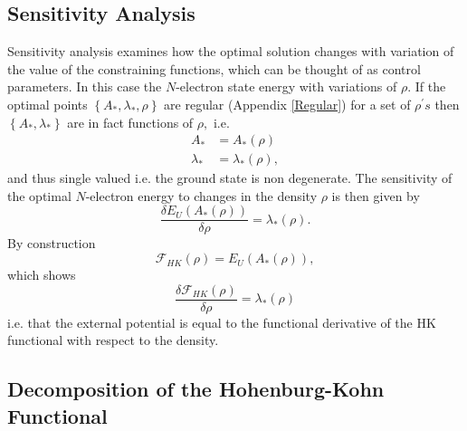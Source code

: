 \documentclass[aps,preprint]{revtex4}%
\begin{document}
\subsection{Sensitivity Analysis\label{SenAnal}}

Sensitivity analysis \cite{Hestenes75} examines how the optimal solution
changes with variation of the value of the constraining functions, which can
be thought of as control parameters. In this case the $N$-electron state
energy with variations of $\rho.$ If the optimal points $\left\{  A_{\ast
},\lambda_{\ast},\rho\right\}  $ are regular (Appendix \ref{Regular}) for a
set of $\rho^{\prime}s$ then $\left\{  A_{\ast},\lambda_{\ast}\right\}  $ are
in fact functions of $\rho,$ i.e.
\begin{align}
A_{\ast}  &  =A_{\ast}\left(  \rho\right) \nonumber\\
\lambda_{\ast}  &  =\lambda_{\ast}\left(  \rho\right)  ,
\end{align}
and thus single valued i.e. the ground state is non degenerate. The
sensitivity of the optimal $N$-electron energy to changes in the density
$\rho$ is then given by
\begin{equation}
\frac{\delta E_{U}\left(  A_{\ast}\left(  \rho\right)  \right)  }{\delta\rho
}=\lambda_{\ast}\left(  \rho\right)  .
\end{equation}
By construction
\begin{equation}
\mathcal{F}_{HK}\left(  \rho\right)  =E_{U}\left(  A_{\ast}\left(
\rho\right)  \right)  ,
\end{equation}
which shows
\begin{equation}
\frac{\delta\mathcal{F}_{HK}\left(  \rho\right)  }{\delta\rho}=\lambda_{\ast
}\left(  \rho\right)
\end{equation}
i.e. that the external potential is equal to the functional derivative of the
HK functional with respect to the density.

\subsection{Decomposition of the Hohenburg-Kohn Functional\label{DecompHK}}
\end{document}
